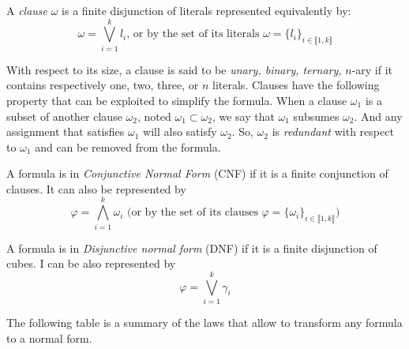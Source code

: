 \begin{definition}[Clause]
A \emph{clause} $\omega$ is a finite disjunction of literals represented equivalently by:
$$\omega = \bigvee_{i=1}^k l_i \text{, or by the set of its literals } \omega = \{l_i\}_{i \in \llbracket 1,k \rrbracket}$$
\end{definition}

With respect to its size, a clause is said to be \emph{unary, binary, ternary,} $n$-ary if it contains respectively one, two, three, or $n$ literals.
Clauses have the following property that can be exploited to simplify the formula.
When a clause $\omega_1$ is a subset of another clause $\omega_2$, noted $\omega_1 \subset \omega_2$,
we say that $\omega_{1}$ subsumes $\omega_{2}$.
 And any assignment that satisfies $\omega_1$ will also satisfy $\omega_2$. So, $\omega_2$ is \emph{redundant}
  with respect to  $\omega_{1}$ and can be removed from the formula.
 
 
\begin{definition}
 A formula is in \emph{Conjunctive Normal Form} (CNF) if it is a finite conjunction of clauses. It can also be represented by
 $$\varphi = \bigwedge_{i=1}^k \omega_i \text{ (or by the set of its clauses } \varphi = \{\omega_i\}_{i \in \llbracket 1,k \rrbracket}\text{)}$$
\end{definition}

 \begin{definition}
A formula is in \emph{Disjunctive normal form} (DNF) if it is a finite disjunction of cubes.
I can be also represented by
$$\varphi = \bigvee_{i=1}^k \gamma_i$$
 \end{definition}


The following table is a summary of the laws that allow to transform any formula to
a normal form.

